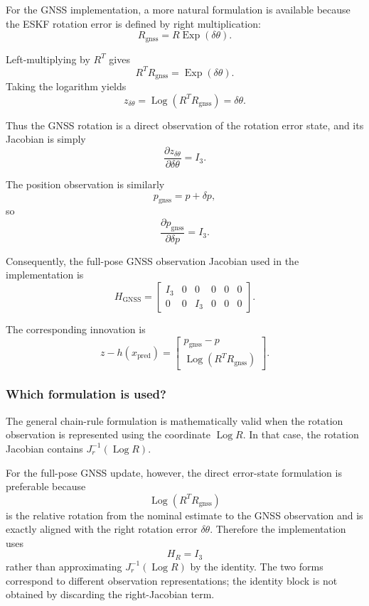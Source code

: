 \documentclass[11pt]{article}
\numberwithin{equation}{section}
\newcommand{\Exp}{\operatorname{Exp}}
\newcommand{\Log}{\operatorname{Log}}
\begin{document}
For the GNSS implementation, a more natural formulation is available
because the ESKF rotation error is defined by right multiplication:
\begin{equation}
\boxed{
R_{\mathrm{gnss}}
=
R\Exp(\delta\theta).
}
\end{equation}

Left-multiplying by $R^T$ gives
\[
R^TR_{\mathrm{gnss}}
=
\Exp(\delta\theta).
\]
Taking the logarithm yields
\begin{equation}
\boxed{
z_{\delta\theta}
=
\Log(R^TR_{\mathrm{gnss}})
=
\delta\theta.
}
\end{equation}

Thus the GNSS rotation is a direct observation of the rotation error
state, and its Jacobian is simply
\begin{equation}
\boxed{
\frac{\partial z_{\delta\theta}}
{\partial\delta\theta}
=
I_3.
}
\end{equation}

The position observation is similarly
\[
p_{\mathrm{gnss}}
=
p+\delta p,
\]
so
\[
\frac{\partial p_{\mathrm{gnss}}}{\partial\delta p}
=
I_3.
\]

Consequently, the full-pose GNSS observation Jacobian used in the
implementation is
\begin{equation}
\boxed{
H_{\mathrm{GNSS}}
=
\begin{bmatrix}
I_3&0&0&0&0&0\\
0&0&I_3&0&0&0
\end{bmatrix}.
}
\end{equation}

The corresponding innovation is
\begin{equation}
\boxed{
z-h(x_{\mathrm{pred}})
=
\begin{bmatrix}
p_{\mathrm{gnss}}-p\\
\Log(R^TR_{\mathrm{gnss}})
\end{bmatrix}.
}
\end{equation}

\subsubsection*{Which formulation is used?}

The general chain-rule formulation is mathematically valid when the
rotation observation is represented using the coordinate
$\Log R$.  In that case, the rotation Jacobian contains
$J_r^{-1}(\Log R)$.

For the full-pose GNSS update, however, the direct error-state
formulation is preferable because
\[
\Log(R^TR_{\mathrm{gnss}})
\]
is the relative rotation from the nominal estimate to the GNSS
observation and is exactly aligned with the right rotation error
$\delta\theta$.  Therefore the implementation uses
\[
\boxed{
H_R=I_3
}
\]
rather than approximating $J_r^{-1}(\Log R)$ by the identity.  The two
forms correspond to different observation representations; the
identity block is not obtained by discarding the right-Jacobian term.
\end{document}
